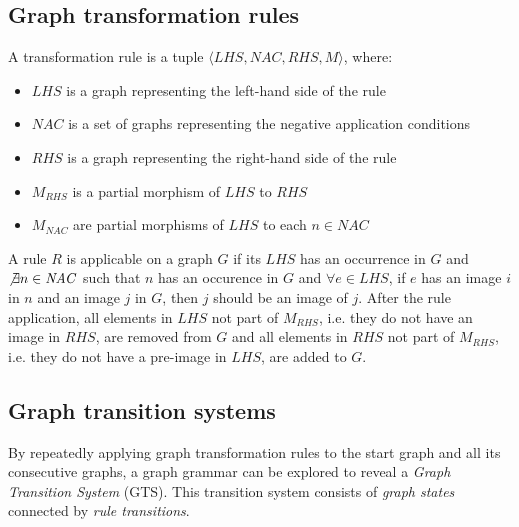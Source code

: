 \subsection{Graph transformation rules}
\begin{definition}
A transformation rule is a tuple $\langle \mathit{LHS}, \mathit{NAC}, \mathit{RHS}, \mathit{M}\rangle$, where:
\begin{itemize}
  \item $\mathit{LHS}$ is a graph representing the left-hand side of the rule
  \item $\mathit{NAC}$ is a set of graphs representing the negative application conditions
  \item $\mathit{RHS}$ is a graph representing the right-hand side of the rule
  \item $\mathit{M_{RHS}}$ is a partial morphism of $\mathit{LHS}$ to $\mathit{RHS}$ 
  \item $\mathit{M_{NAC}}$ are partial morphisms of $\mathit{LHS}$ to each $n \in \mathit{NAC}$
\end{itemize}
\end{definition}

A rule $R$ is applicable on a graph $G$ if its $\mathit{LHS}$ has an occurrence in $G$ and $\not\exists n \in \mathit{NAC}$ such that $n$ has an occurence in $G$ and $\forall e \in \mathit{LHS}$, if $e$ has an image $i$ in $n$ and an image $j$ in $G$, then $j$ should be an image of $j$. After the rule application, all elements in $\mathit{LHS}$ not part of $\mathit{M_{RHS}}$, i.e. they do not have an image in $\mathit{RHS}$, are removed from $G$ and all elements in $\mathit{RHS}$ not part of $\mathit{M_{RHS}}$, i.e. they do not have a pre-image in $\mathit{LHS}$, are added to $G$.

\subsection{Graph transition systems}
By repeatedly applying graph transformation rules to the start graph and all its consecutive graphs, a graph grammar can be explored to reveal a \textit{Graph Transition System} (GTS). This transition system consists of \textit{graph states} connected by \textit{rule transitions}.


